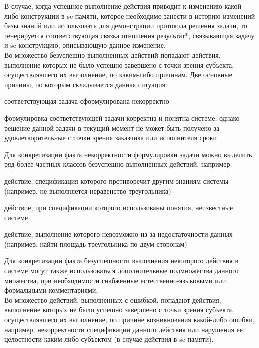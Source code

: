 \begin{frame}{}
    В случае, когда успешное выполнение действия приводит к изменению какой-либо конструкции в sc-памяти, которое необходимо занести в историю изменений базы знаний или использовать для демонстрации протокола решения задачи, то генерируется соответствующая связка отношения результат*, связывающая задачу и sc-конструкцию, описывающую данное изменение.\\
Во множество безуспешно выполненных действий попадают действия, выполнение которых не было успешно завершено с точки зрения субъекта, осуществлявшего их выполнение, по каким-либо причинам.
Две основные причины, по которым складывается данная ситуация:
\begin{textitemize}
    \item соответствующая задача сформулирована некорректно
    \item формулировка соответствующей задачи корректна и понятна системе, однако решение данной задачи в текущий момент не может быть получено за удовлетворительные с точки зрения заказчика или исполнителя сроки
\end{textitemize}
\end{frame}
\begin{frame}{}
Для конкретизации факта некорректности формулировки задачи можно выделить ряд более частных классов безуспешно выполненных действий, например:
\begin{textitemize}
    \item действие, спецификация которого противоречит другим знаниям системы (например, не выполняется неравенство треугольника)
    \item действие, при спецификации которого использованы понятия, неизвестные системе
    \item действие, выполнение которого невозможно из-за недостаточности данных (например, найти площадь треугольника по двум сторонам)
\end{textitemize}
    Для конкретизации факта безуспешности выполнения некоторого действия в системе могут также использоваться дополнительные подмножества данного множества, при необходимости снабженные естественно-языковыми или формальными комментариями.\\
Во множество действий, выполненных с ошибкой, попадают действия, выполнение которых не было успешно завершено с точки зрения субъекта, осуществлявшего их выполнение, по причине возникновения какой-либо ошибки, например, некорректности спецификации данного действия или нарушения ее целостности каким-либо субъектом (в случае действия в sc-памяти).
\end{frame}

